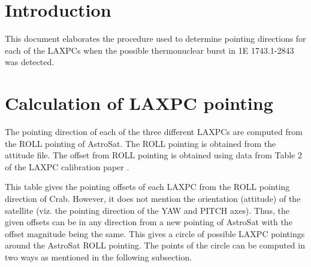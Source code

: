 \documentclass[11pt,a4paper,eulermath,pdfspacing]{article} %
\begin{document}
	\title{}
	\author{\spacedlowsmallcaps{\today}}
	\date{Version 1.0} 
    \maketitle
 
\section{Introduction}
This document elaborates the procedure used to determine pointing directions for
each of the LAXPCs when the possible thermonuclear burst in 1E 1743.1-2843 was
detected.

\section{Calculation of LAXPC pointing}
The pointing direction of each of the three different LAXPCs are computed from
the ROLL pointing of AstroSat. The ROLL pointing is obtained from the attitude
file. The offset from ROLL pointing is obtained using data from Table 2 of the LAXPC calibration paper
\citep{anti:2017}. 

This table gives the pointing offsets of each LAXPC from the
ROLL pointing direction of Crab. However, it does not mention the orientation
(attitude) of the satellite (viz. the pointing direction of the YAW and PITCH
axes). Thus, the given offsets can be in any direction from a new pointing of
AstroSat with the offset magnitude being the same. This gives a circle of
possible LAXPC pointings around the AstroSat ROLL pointing. The points of the
circle can be computed in two ways as mentioned in the following subsection.
\end{document}
